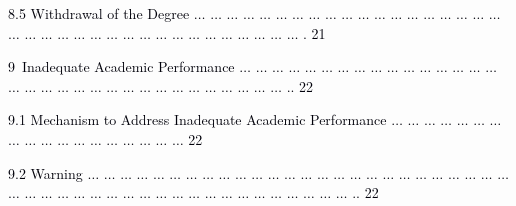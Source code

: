 \documentclass[12pt]{article}
\begin{document}
\vspace{\baselineskip}
\begin{adjustwidth}{0.21in}{0.0in}
{\fontsize{7pt}{8.4pt}\selectfont \textcolor[HTML]{00000A}{8.5 Withdrawal of the Degree $ \ldots $ $ \ldots $ $ \ldots $ $ \ldots $ $ \ldots $ $ \ldots $ $ \ldots $ $ \ldots $ $ \ldots $ $ \ldots $ $ \ldots $ $ \ldots $ $ \ldots $ $ \ldots $ $ \ldots $ $ \ldots $ $ \ldots $ $ \ldots $ $ \ldots $ $ \ldots $ $ \ldots $ $ \ldots $ $ \ldots $ $ \ldots $ $ \ldots $ $ \ldots $ $ \ldots $ $ \ldots $ $ \ldots $ $ \ldots $ $ \ldots $ $ \ldots $ $ \ldots $ $ \ldots $ $ \ldots $ $ \ldots $ $ \ldots $ . 21}\par}\par

\end{adjustwidth}


\vspace{\baselineskip}
{\fontsize{7pt}{8.4pt}\selectfont \textcolor[HTML]{00000A}{9\ Inadequate Academic Performance $ \ldots $ $ \ldots $ $ \ldots $ $ \ldots $ $ \ldots $ $ \ldots $ $ \ldots $ $ \ldots $ $ \ldots $ $ \ldots $ $ \ldots $ $ \ldots $ $ \ldots $ $ \ldots $ $ \ldots $ $ \ldots $ $ \ldots $ $ \ldots $ $ \ldots $ $ \ldots $ $ \ldots $ $ \ldots $ $ \ldots $ $ \ldots $ $ \ldots $ $ \ldots $ $ \ldots $ $ \ldots $ $ \ldots $ $ \ldots $ $ \ldots $ $ \ldots $ $ \ldots $ ..  22}\par}\par


\vspace{\baselineskip}
\begin{adjustwidth}{0.21in}{0.0in}
{\fontsize{7pt}{8.4pt}\selectfont \textcolor[HTML]{00000A}{9.1 Mechanism to Address Inadequate Academic Performance $ \ldots $ $ \ldots $ $ \ldots $ $ \ldots $ $ \ldots $ $ \ldots $ $ \ldots $ $ \ldots $ $ \ldots $ $ \ldots $ $ \ldots $ $ \ldots $ $ \ldots $ $ \ldots $ $ \ldots $ $ \ldots $ $ \ldots $ $ \ldots $  22}\par}\par

\end{adjustwidth}


\vspace{\baselineskip}
\begin{adjustwidth}{0.21in}{0.0in}
{\fontsize{7pt}{8.4pt}\selectfont \textcolor[HTML]{00000A}{9.2 Warning $ \ldots $ $ \ldots $ $ \ldots $ $ \ldots $ $ \ldots $ $ \ldots $ $ \ldots $ $ \ldots $ $ \ldots $ $ \ldots $ $ \ldots $ $ \ldots $ $ \ldots $ $ \ldots $ $ \ldots $ $ \ldots $ $ \ldots $ $ \ldots $ $ \ldots $ $ \ldots $ $ \ldots $ $ \ldots $ $ \ldots $ $ \ldots $ $ \ldots $ $ \ldots $ $ \ldots $ $ \ldots $ $ \ldots $ $ \ldots $ $ \ldots $ $ \ldots $ $ \ldots $ $ \ldots $ $ \ldots $ $ \ldots $ $ \ldots $ $ \ldots $ $ \ldots $ $ \ldots $ $ \ldots $ $ \ldots $ $ \ldots $ $ \ldots $ $ \ldots $ $ \ldots $ $ \ldots $ .. 22}\par}\par

\end{adjustwidth}
\end{document}
